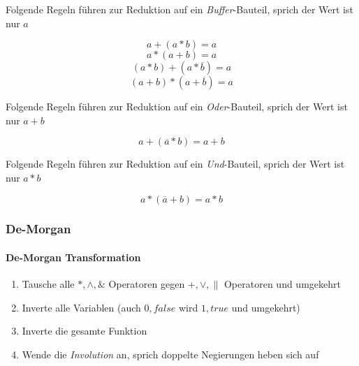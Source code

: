 \documentclass{article}
\begin{document}
Folgende Regeln führen zur Reduktion auf ein \emph{Buffer}-Bauteil, sprich der Wert ist nur $a$

\begin{equation*}
    a + ( a * b) = a
\end{equation*}
\begin{equation*}
    a * ( a + b) = a
\end{equation*}
\begin{equation*}
    (a * b) + ( a * \overline{b}) = a
\end{equation*}
\begin{equation*}
    (a + b) * (a + \overline{b}) = a
\end{equation*}


Folgende Regeln führen zur Reduktion auf ein \emph{Oder}-Bauteil, sprich der Wert ist nur $a+b$


\begin{equation*}
   a + (\overline{a} * b) = a + b
\end{equation*}

Folgende Regeln führen zur Reduktion auf ein \emph{Und}-Bauteil, sprich der Wert ist nur $a*b$


\begin{equation*}
    a * (\overline{a} + b) = a * b
 \end{equation*}
 

\subsubsection{De-Morgan}


\paragraph{De-Morgan Transformation}
\begin{enumerate}[(1)]
    \item  Tausche alle $*,\land,\&$ Operatoren gegen  $+,\lor,\|$ Operatoren und umgekehrt 
    \item  Inverte alle Variablen (auch $0,false$ wird $1,true$ und umgekehrt)
    \item  Inverte die gesamte Funktion
    \item  Wende die \emph{Involution} an, sprich doppelte Negierungen heben sich auf 
\end{enumerate}
\end{document}
